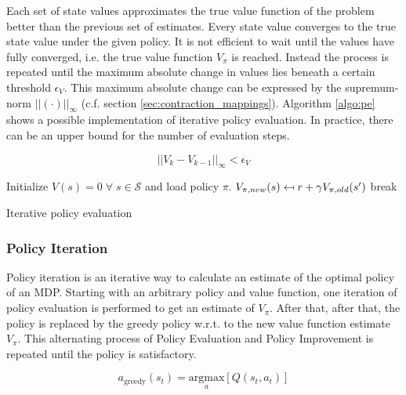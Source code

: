 Each set of state values approximates the true value function of the problem better than the previous set of estimates. Every state value converges to the true state value under the given policy. It is not efficient to wait until the values have fully converged, i.e. the true value function $V_\pi$ is reached. Instead the process is repeated until the maximum absolute change in values lies beneath a certain threshold $\epsilon_V$. This maximum absolute change can be expressed by the supremum-norm $||(\cdot)||_\infty$ (c.f. section \ref{sec:contraction_mappings}). Algorithm \ref{algo:pe} shows a possible implementation of iterative policy evaluation. In practice, there can be an upper bound for the number of evaluation steps.

\begin{equation}
||V_{k}-V_{k-1}||_\infty<\epsilon_V
\label{eq:pe_stopping_criterion}
\end{equation}

\begin{algorithm}[hbt]
	
	\begin{algorithmic}[0] %
		
		\State Initialize $V(s) = 0 \; \forall \; s \in \mathcal{S}$ and load policy $\pi$.
		\State $V_{\pi,new}(s) \mathrel{\reflectbox{\ensuremath{\mapsto}}} r+\gamma V_ {\pi,old}(s')$
		\EndFor
		\State break
		\EndIf
		\EndWhile
		\EndFunction
	\end{algorithmic}
	\caption{Iterative policy evaluation}
	\label{algo:pe}
\end{algorithm}

\subsubsection{Policy Iteration}
\label{sec:PI}
Policy iteration is an iterative way to calculate an estimate of the optimal policy of an MDP. Starting with an arbitrary policy and value function, one iteration of policy evaluation is performed to get an estimate of $V_\pi$. After that, after that, the policy is replaced by the greedy policy w.r.t. to the new value function estimate $V_\pi$. This alternating process of Policy Evaluation and Policy Improvement is repeated until the policy is satisfactory.

\begin{equation}
a_{\text{greedy}}(s_t) = \underset{a}{\text{argmax}}[Q(s_t,a_t)]
\end{equation}

